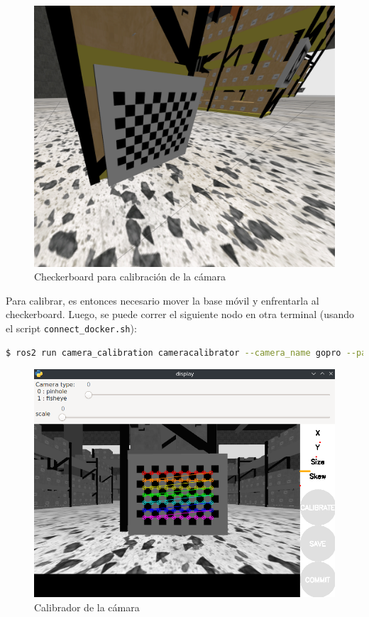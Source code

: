 \documentclass[12pt, a4paper]{report}
\begin{document}
		\begin{figure}[H]
			\centering
			\includegraphics[width=0.7\linewidth]{img/Screenshot_20240228_143927}
			\caption{Checkerboard para calibración de la cámara}
			\label{fig:calibracion-checkerboard}
		\end{figure}

			Para calibrar, es entonces necesario mover la base móvil y enfrentarla al checkerboard.
			Luego, se puede correr el siguiente nodo en otra terminal (usando el script \texttt{connect\_docker.sh}):
	\begin{lstlisting}[language=Bash,label={lst:lstlisting2}]
$ ros2 run camera_calibration cameracalibrator --camera_name gopro --pattern chessboard --size 7x10 --square 0.015 --no-service-check --ros-args -r image:=/gopro_camera/image_raw --log-level DEBUG
	\end{lstlisting}

		\begin{figure}[H]
			\centering
			\includegraphics[width=0.7\linewidth]{img/Screenshot_20240228_144839}
			\caption{Calibrador de la cámara}
			\label{fig:calibracion-calibrator}
		\end{figure}
\end{document}
